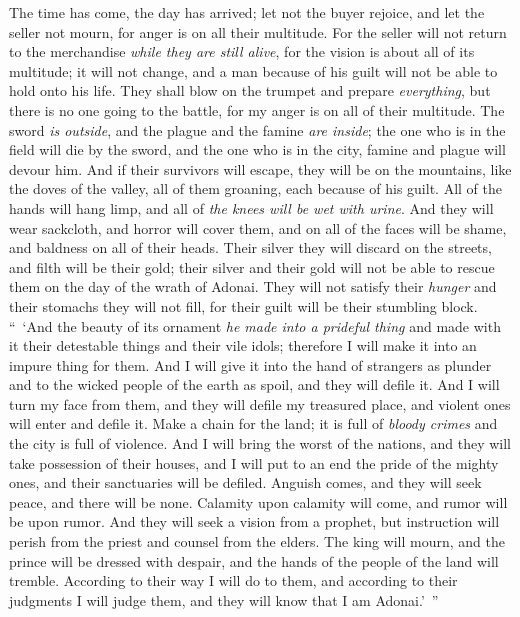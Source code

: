 \begin{biblechapter}
\verse The time has come, the day has arrived; let not the buyer rejoice, and let the seller not mourn, for anger is on all their multitude.
\verse For the seller will not return to the merchandise \textit{while they are still alive}, for the vision is about all of its multitude; it will not change, and a man because of his guilt will not be able to hold onto his life.
\verse They shall blow on the trumpet and prepare \textit{everything}, but there is no one going to the battle, for my anger is on all of their multitude.
\verse The sword \textit{is outside}, and the plague and the famine \textit{are inside}; the one who is in the field will die by the sword, and the one who is in the city, famine and plague will devour him.
\verse And if their survivors will escape, they will be on the mountains, like the doves of the valley, all of them groaning, each because of his guilt.
\verse All of the hands will hang limp, and all of \textit{the knees will be wet with urine}.
\verse And they will wear sackcloth, and horror will cover them, and on all of the faces will be shame, and baldness on all of their heads.
\verse Their silver they will discard on the streets, and filth will be their gold; their silver and their gold will not be able to rescue them on the day of the wrath of Adonai. They will not satisfy their \textit{hunger} and their stomachs they will not fill, for their guilt will be their stumbling block.
 “ ‘And the beauty of its ornament \textit{he made into a prideful thing} and made with it their detestable things and their vile idols; therefore I will make it into an impure thing for them.
\verse And I will give it into the hand of strangers as plunder and to the wicked people of the earth as spoil, and they will defile it.
\verse And I will turn my face from them, and they will defile my treasured place, and violent ones will enter and defile it.
\verse Make a chain for the land; it is full of \textit{bloody crimes} and the city is full of violence.
\verse And I will bring the worst of the nations, and they will take possession of their houses, and I will put to an end the pride of the mighty ones, and their sanctuaries will be defiled.
\verse Anguish comes, and they will seek peace, and there will be none.
\verse Calamity upon calamity will come, and rumor will be upon rumor. And they will seek a vision from a prophet, but instruction will perish from the priest and counsel from the elders.
\verse The king will mourn, and the prince will be dressed with despair, and the hands of the people of the land will tremble. According to their way I will do to them, and according to their judgments I will judge them, and they will know that I am Adonai.’ ”
\end{biblechapter}

